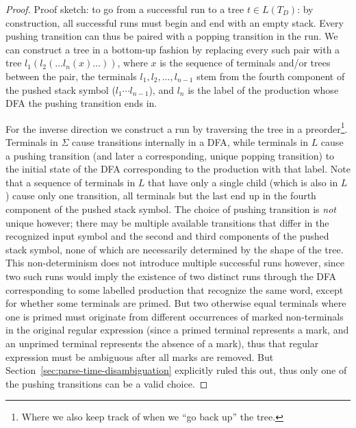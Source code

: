 \documentclass[acmsmall,review,anonymous]{acmart}\settopmatter{printfolios=true,printccs=false,printacmref=false}
\newcommand{\T}{\Sigma} %
\newcommand{\Labels}{L} %
\begin{document}
\begin{proof}
  Proof sketch: to go from a successful run to a tree $t \in L(T_D)$: by construction, all successful runs must begin and end with an empty stack. Every pushing transition can thus be paired with a popping transition in the run. We can construct a tree in a bottom-up fashion by replacing every such pair with a tree $l_1(l_2(\ldots l_n(x)\ldots))$, where $x$ is the sequence of terminals and/or trees between the pair, the terminals $l_1, l_2, \ldots, l_{n-1}$ stem from the fourth component of the pushed stack symbol ($l_1 \cdots l_{n-1}$), and $l_n$ is the label of the production whose DFA the pushing transition ends in.

  For the inverse direction we construct a run by traversing the tree in a preorder\footnote{Where we also keep track of when we ``go back up'' the tree.}. Terminals in $\T$ cause transitions internally in a DFA, while terminals in $\Labels$ cause a pushing transition (and later a corresponding, unique popping transition) to the initial state of the DFA corresponding to the production with that label. Note that a sequence of terminals in $\Labels$ that have only a single child (which is also in $\Labels$) cause only one transition, all terminals but the last end up in the fourth component of the pushed stack symbol. The choice of pushing transition is \emph{not} unique however; there may be multiple available transitions that differ in the recognized input symbol and the second and third components of the pushed stack symbol, none of which are necessarily determined by the shape of the tree. This non-determinism does not introduce multiple successful runs however, since two such runs would imply the existence of two distinct runs through the DFA corresponding to some labelled production that recognize the same word, except for whether some terminals are primed. But two otherwise equal terminals where one is primed must originate from different occurrences of marked non-terminals in the original regular expression (since a primed terminal represents a mark, and an unprimed terminal represents the absence of a mark), thus that regular expression must be ambiguous after all marks are removed. But Section~\ref{sec:parse-time-disambiguation} explicitly ruled this out, thus only one of the pushing transitions can be a valid choice.

\end{proof}
\end{document}
